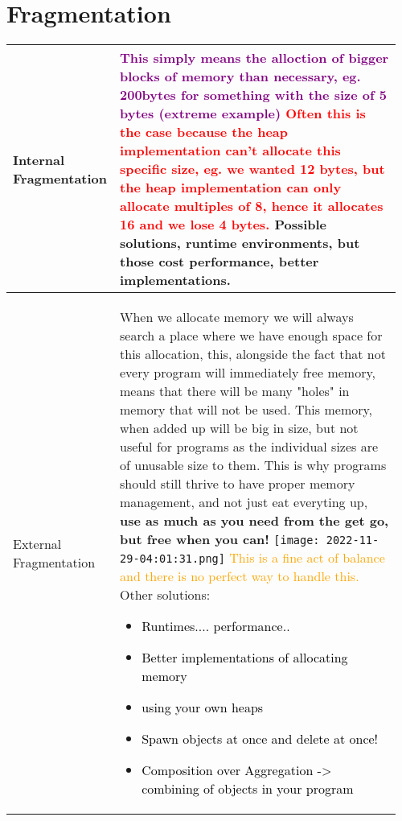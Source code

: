\documentclass[main.tex,fontsize=8pt,paper=a4,paper=portrait,DIV=calc,]{scrartcl}
\begin{document}
\pagebreak 
\begin{table}[ht!]
\section{Fragmentation}
\begin{tabular}{|m{0.2\linewidth}|m{0.755\linewidth}|}
\hline
Internal Fragmentation & 
\textcolor{purple}{This simply means the alloction of bigger blocks of memory than necessary, eg. 200bytes for something with the size of 5 bytes (extreme example)}\newline
\textcolor{red}{Often this is the case because the heap implementation can't allocate this specific size, eg. we wanted 12 bytes, but the heap implementation can only allocate multiples of 8, hence it allocates 16 and we lose 4 bytes.}\newline
Possible solutions, \textbf{runtime environments, but those cost performance}, better implementations.\\
\hline
External Fragmentation & 
When we allocate memory we will always search a place where we have enough space for this allocation, this, alongside the fact that not every program will immediately free memory, means that there will be many "holes" in memory that will not be used.\newline
This memory, when added up will be big in size, but not useful for programs as the individual sizes are of unusable size to them.\newline
This is why programs should still thrive to have proper memory management, and not just eat everyting up, \textbf{use as much as you need from the get go, but free when you can!}\newline
\texttt{[image: 2022-11-29-04:01:31.png]}\newline
\textcolor{orange}{This is a fine act of balance and there is no perfect way to handle this.}\newline
Other solutions:\newline 
\begin{itemize}
\item \textcolor{black}{Runtimes.... performance..}
\item \textcolor{black}{Better implementations of allocating memory}
\item \textcolor{black}{using your own heaps}
\item \textcolor{black}{Spawn objects at once and delete at once!}
\item \textcolor{black}{Composition over Aggregation -> combining of objects in your program}

\end{itemize}
\end{tabular}
\end{table}
\end{document}
